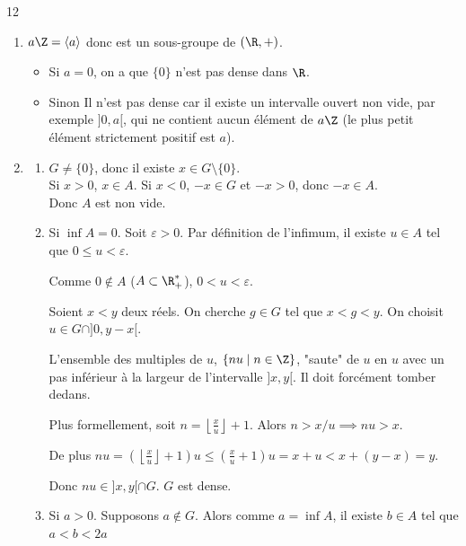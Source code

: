 \begin{correction}{12}
\begin{enumerate}
    \item $a\Z = \langle a \rangle$ donc est un sous-groupe de $(\R,+)$. 
    \begin{itemize}
        \item Si $a = 0$, on a que $\{0\}$ n'est pas dense dans $\R$.
        \item Sinon
        Il n'est pas dense car il existe un intervalle ouvert non vide, par exemple $]0, a[$, 
        qui ne contient aucun élément de $a\Z$ (le plus petit élément strictement positif est $a$).
    \end{itemize}

    \item
    \begin{enumerate}
        \item $G \neq \{0\}$, donc il existe $x \in G \setminus \{0\}$. \\
        Si $x > 0$, $x \in A$.
        Si $x < 0$, $-x \in G$ et $-x > 0$, donc $-x \in A$. \\
        Donc $A$ est non vide.

        \item Si $\inf A = 0$. Soit $\varepsilon > 0$.
        Par définition de l'infimum, il existe $u \in A$ tel que $0 \leqslant u < \varepsilon$. 
        
        Comme $0 \notin A$ ($A \subset \R^*_+$), $0 < u < \varepsilon$.

        Soient $x < y$ deux réels. On cherche $g \in G$ tel que $x < g < y$.
        On choisit $u \in G \cap ]0, y-x[$.

        L'ensemble des multiples de $u$, $\{nu \mid n \in \Z\}$, 
        "saute" de $u$ en $u$ avec un pas inférieur à la largeur de l'intervalle $]x,y[$. 
        Il doit forcément tomber dedans.

        Plus formellement, soit $n = \left\lfloor \frac{x}{u} \right\rfloor + 1$. Alors $n > x/u \implies nu > x$.
        
        De plus $nu = \left(\left\lfloor \frac{x}{u} \right\rfloor + 1\right) u \leqslant \left(\frac{x}{u} + 1\right)u = x + u < x + (y-x) = y$.

        Donc $nu \in ]x,y[ \cap G$. $G$ est dense.

        \item Si $a > 0$. Supposons $a \notin G$. Alors comme $a = \inf A$, il existe $b \in A$ tel que $a < b < 2a$


\end{enumerate}
\end{enumerate}
\end{correction}
